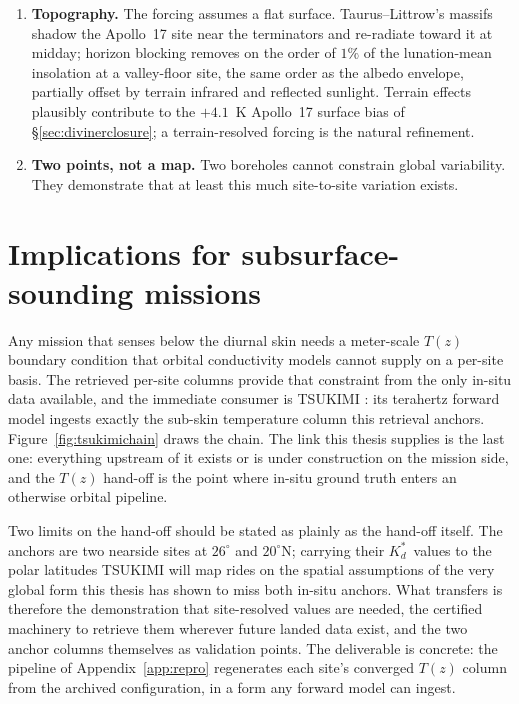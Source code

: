 \documentclass[11pt,a4paper,oneside]{report}
\newcommand{\Kd}{\ensuremath{K_d}}
\newcommand{\Kds}{\ensuremath{K_d^{*}}}
\begin{document}
\begin{enumerate}
    principle mimic a site contrast. Two internal diagnostics limit
    this reading: within the Apollo~17 set, which itself spans a full
    meter, a depth-constant \Kd\ leaves only $0.40$~K RMSE and
    predicts the withheld $234$~cm sensor to $0.25$~K, where a still
    rising $K(z)$ would curve the profile detectably; and the
    borestem-cut sweep leaves both retrievals unchanged as the
    Apollo~15 set is restricted to its deepest five sensors.
    Compaction below the probed range cannot be excluded with two
    boreholes, but the data do not require it.
  \item \textbf{Topography.} The forcing assumes a flat surface.
    Taurus--Littrow's massifs shadow the Apollo~17 site near the
    terminators and re-radiate toward it at midday; horizon blocking
    removes on the order of $1\%$ of the lunation-mean insolation at
    a valley-floor site, the same order as the albedo envelope,
    partially offset by terrain infrared and reflected sunlight.
    Terrain effects plausibly contribute to the $+4.1$~K Apollo~17
    surface bias of \S\ref{sec:divinerclosure}; a terrain-resolved
    forcing is the natural refinement.
  \item \textbf{Two points, not a map.} Two boreholes cannot
    constrain global variability. They demonstrate that at least this
    much site-to-site variation exists.
\end{enumerate}

\section{Implications for subsurface-sounding missions}\label{sec:implications}
Any mission that senses below the diurnal skin needs a meter-scale
$T(z)$ boundary condition that orbital conductivity models cannot
supply on a per-site basis. The retrieved per-site columns provide
that constraint from the only in-situ data available, and the
immediate consumer is TSUKIMI \citep{tsukimi2022}: its terahertz
forward model ingests exactly the sub-skin temperature column this
retrieval anchors. Figure~\ref{fig:tsukimichain} draws the chain.
The link this thesis supplies is the last one: everything upstream of
it exists or is under construction on the mission side, and the
$T(z)$ hand-off is the point where in-situ ground truth enters an
otherwise orbital pipeline.

Two limits on the hand-off should be stated as plainly as the
hand-off itself. The anchors are two nearside sites at $26^{\circ}$
and $20^{\circ}$N; carrying their \Kds\ values to the polar latitudes
TSUKIMI will map rides on the spatial assumptions of the very global
form this thesis has shown to miss both in-situ anchors. What
transfers is therefore the demonstration that site-resolved values
are needed, the certified machinery to retrieve them wherever future
landed data exist, and the two anchor columns themselves as
validation points. The deliverable is concrete: the pipeline of
Appendix~\ref{app:repro} regenerates each site's converged $T(z)$
column from the archived configuration, in a form any forward model
can ingest.
\end{document}
